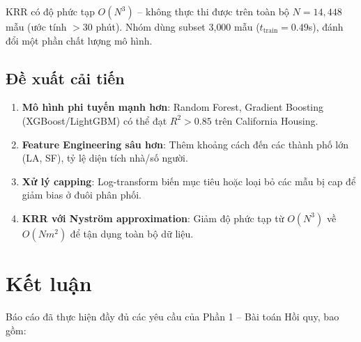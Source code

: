 \documentclass[12pt, a4paper]{article}
\begin{document}
KRR có độ phức tạp $O(N^3)$ -- không thực thi được trên toàn bộ
$N = 14{,}448$ mẫu (ước tính $> 30$ phút). Nhóm dùng subset
3{,}000 mẫu ($t_{\text{train}} = 0.49$s), đánh đổi một phần chất
lượng mô hình.

\subsection{Đề xuất cải tiến}

\begin{enumerate}
  \item \textbf{Mô hình phi tuyến mạnh hơn}: Random Forest, Gradient
        Boosting (XGBoost/LightGBM) có thể đạt $R^2 > 0.85$ trên
        California Housing.
  \item \textbf{Feature Engineering sâu hơn}: Thêm khoảng cách đến
        các thành phố lớn (LA, SF), tỷ lệ diện tích nhà/số người.
  \item \textbf{Xử lý capping}: Log-transform biến mục tiêu hoặc
        loại bỏ các mẫu bị cap để giảm bias ở đuôi phân phối.
  \item \textbf{KRR với Nyström approximation}: Giảm độ phức tạp
        từ $O(N^3)$ về $O(Nm^2)$ để tận dụng toàn bộ dữ liệu.
\end{enumerate}

\section{Kết luận}
\label{sec:conclusion}

Báo cáo đã thực hiện đầy đủ các yêu cầu của Phần 1 -- Bài toán Hồi quy,
bao gồm:
\end{document}
